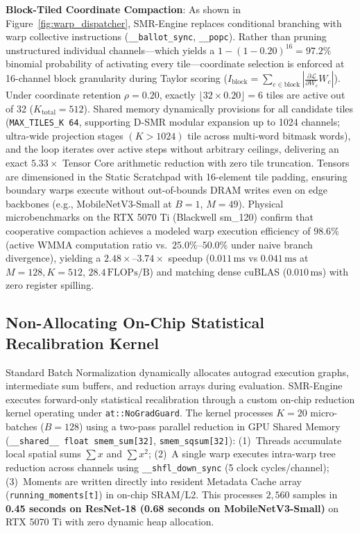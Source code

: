 \documentclass{article}
\begin{document}
\noindent\textbf{Block-Tiled Coordinate Compaction}: As shown in Figure~\ref{fig:warp_dispatcher}, SMR-Engine replaces conditional branching with warp collective instructions (\texttt{\_\_ballot\_sync}, \texttt{\_\_popc}). Rather than pruning unstructured individual channels---which yields a $1-(1-0.20)^{16} = 97.2\%$ binomial probability of activating every tile---coordinate selection is enforced at 16-channel block granularity during Taylor scoring ($I_{\mathrm{block}} = \sum_{c \in \mathrm{block}} |\frac{\partial \mathcal{L}}{\partial W_c} W_c|$). Under coordinate retention $\rho = 0.20$, exactly $\lfloor 32 \times 0.20 \rfloor = 6$ tiles are active out of 32 ($K_{\mathrm{total}} = 512$). Shared memory dynamically provisions for all candidate tiles (\texttt{MAX\_TILES\_K 64}, supporting D-SMR modular expansion up to 1024 channels; ultra-wide projection stages $(K > 1024)$ tile across multi-word bitmask words), and the loop iterates over active steps without arbitrary ceilings, delivering an exact $\mathbf{5.33\times}$ Tensor Core arithmetic reduction with zero tile truncation. Tensors are dimensioned in the Static Scratchpad with 16-element tile padding, ensuring boundary warps execute without out-of-bounds DRAM writes even on edge backbones (e.g., MobileNetV3-Small at $B=1$, $M=49$). Physical microbenchmarks on the RTX 5070 Ti (Blackwell sm\_120) confirm that cooperative compaction achieves a modeled warp execution efficiency of $\mathbf{98.6\%}$ (active WMMA computation ratio vs.\ $25.0\%\text{--}50.0\%$ under naive branch divergence), yielding a $\mathbf{2.48\times\text{--}3.74\times}$ speedup ($0.011\,\text{ms}$ vs $0.041\,\text{ms}$ at $M{=}128, K{=}512$, $28.4\,\text{FLOPs/B}$) and matching dense cuBLAS ($0.010\,\text{ms}$) with zero register spilling.

\subsection{Non-Allocating On-Chip Statistical Recalibration Kernel}
Standard Batch Normalization dynamically allocates autograd execution graphs, intermediate sum buffers, and reduction arrays during evaluation. SMR-Engine executes forward-only statistical recalibration through a custom on-chip reduction kernel operating under \texttt{at::NoGradGuard}. The kernel processes $K=20$ micro-batches ($B=128$) using a two-pass parallel reduction in GPU Shared Memory (\texttt{\_\_shared\_\_ float smem\_sum[32]}, \texttt{smem\_sqsum[32]}): (1)~Threads accumulate local spatial sums $\sum x$ and $\sum x^2$; (2)~A single warp executes intra-warp tree reduction across channels using \texttt{\_\_shfl\_down\_sync} (5 clock cycles/channel); (3)~Moments are written directly into resident Metadata Cache array (\texttt{running\_moments[t]}) in on-chip SRAM/L2. This processes $2{,}560$ samples in \textbf{0.45 seconds on ResNet-18 (0.68 seconds on MobileNetV3-Small)} on RTX 5070 Ti with zero dynamic heap allocation.
\end{document}
